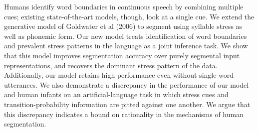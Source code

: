 Humans identify word boundaries in continuous speech by combining multiple cues; existing state-of-the-art models, though, look at a single cue. We extend
 the generative model of Goldwater et al (2006) to segment using syllable
 stress as well as phonemic form. Our new model treats identification of word
 boundaries and prevalent stress patterns in the language as a joint inference
 task.  We show that this model improves segmentation accuracy over purely
 segmental input representations, and recovers the dominant stress pattern of
 the data.  Additionally, our model retains high performance even without
 single-word utterances.  We also demonstrate a discrepancy in the performance
 of our model and human infants on an artificial-language task in which stress
 cues and transition-probability information are pitted against one another.  We
 argue that this discrepancy indicates a bound on rationality in the mechanisms
 of human segmentation.

